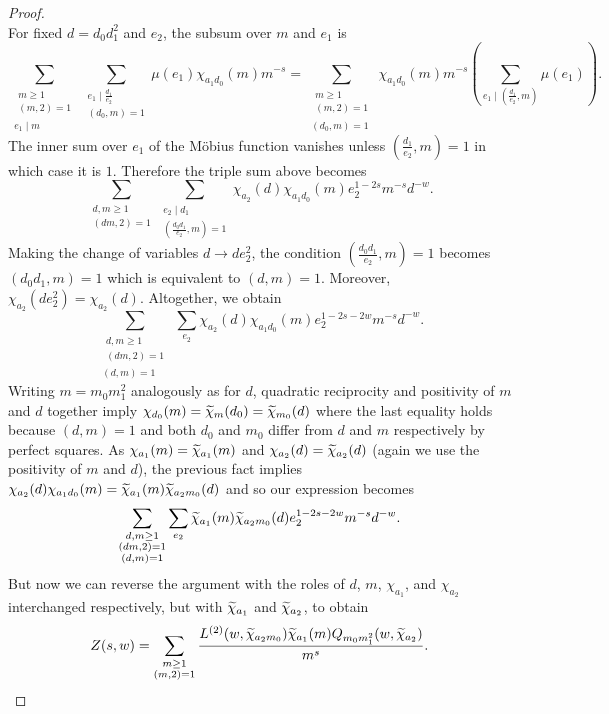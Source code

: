 \documentclass[12pt,reqno,oneside]{amsart}
\begin{document}
\begin{proof}
\[        \]
        For fixed $d = d_{0}d_{1}^{2}$ and $e_{2}$, the subsum over $m$ and $e_{1}$ is
        \[
            \sum_{\substack{\substack{m \ge 1 \\ (m,2) = 1} \\ e_{1} \mid m}}\sum_{\substack{e_{1} \mid \frac{d_{1}}{e_{2}} \\ (d_{0},m) = 1}}\mu(e_{1})\chi_{a_{1}d_{0}}(m)m^{-s} = \sum_{\substack{\substack{m \ge 1 \\ (m,2) = 1} \\ (d_{0},m) = 1}}\chi_{a_{1}d_{0}}(m)m^{-s}\left(\sum_{e_{1} \mid \left(\frac{d_{1}}{e_{2}},m\right)}\mu(e_{1})\right).
        \]
        The inner sum over $e_{1}$ of the M\"obius function vanishes unless $\left(\frac{d_{1}}{e_{2}},m\right) = 1$ in which case it is $1$. Therefore the triple sum above becomes
        \[
            \sum_{\substack{d,m \ge 1 \\ (dm,2) = 1}}\sum_{\substack{e_{2} \mid d_{1} \\ \left(\frac{d_{0}d_{1}}{e_{2}},m\right) = 1}}\chi_{a_{2}}(d)\chi_{a_{1}d_{0}}(m)e_{2}^{1-2s}m^{-s}d^{-w}.
        \]
        Making the change of variables $d \to de_{2}^{2}$, the condition $\left(\frac{d_{0}d_{1}}{e_{2}},m\right) = 1$ becomes $(d_{0}d_{1},m) = 1$ which is equivalent to $(d,m) = 1$. Moreover, $\chi_{a_{2}}(de_{2}^{2}) = \chi_{a_{2}}(d)$. Altogether, we obtain
        \[
            \sum_{\substack{\substack{d,m \ge 1 \\ (dm,2) = 1} \\ (d,m) = 1}}\sum_{e_{2}}\chi_{a_{2}}(d)\chi_{a_{1}d_{0}}(m)e_{2}^{1-2s-2w}m^{-s}d^{-w}.
        \]
        Writing $m = m_{0}m_{1}^{2}$ analogously as for $d$, quadratic reciprocity and positivity of $m$ and $d$ together imply $\chi_{d_{0}}(m) = \widetilde{\chi}_{m}(d_{0}) = \widetilde{\chi}_{m_{0}}(d)$ where the last equality holds because $(d,m) = 1$ and both $d_{0}$ and $m_{0}$ differ from $d$ and $m$ respectively by perfect squares. As $\chi_{a_{1}}(m) = \widetilde{\chi}_{a_{1}}(m)$ and $\chi_{a_{2}}(d) = \widetilde{\chi}_{a_{2}}(d)$ (again we use the positivity of $m$ and $d$), the previous fact implies $\chi_{a_{2}}(d)\chi_{a_{1}d_{0}}(m) = \widetilde{\chi}_{a_{1}}(m)\widetilde{\chi}_{a_{2}m_{0}}(d)$ and so our expression becomes
        \[
            \sum_{\substack{\substack{d,m \ge 1 \\ (dm,2) = 1} \\ (d,m) = 1}}\sum_{e_{2}}\widetilde{\chi}_{a_{1}}(m)\widetilde{\chi}_{a_{2}m_{0}}(d)e_{2}^{1-2s-2w}m^{-s}d^{-w}.
        \]
        But now we can reverse the argument with the roles of $d$, $m$, $\chi_{a_{1}}$, and $\chi_{a_{2}}$ interchanged respectively, but with $\widetilde{\chi}_{a_{1}}$ and $\widetilde{\chi}_{a_{2}}$, to obtain
        \[
            Z(s,w) = \sum_{\substack{m \ge 1 \\ (m,2) = 1}}\frac{L^{(2)}(w,\widetilde{\chi}_{a_{2}m_{0}})\widetilde{\chi}_{a_{1}}(m)Q_{m_{0}m_{1}^{2}}(w,\widetilde{\chi}_{a_{2}})}{m^{s}}.
        \]
    \end{proof}
\end{document}
